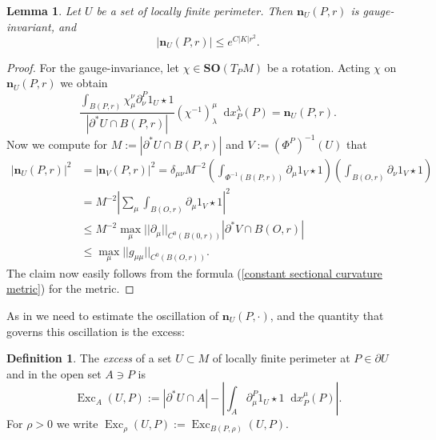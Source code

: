 \documentclass[reqno,10pt]{amsart}
\newcommand{\SpOrth}{\mathbf{SO}}
\DeclareMathOperator{\Exc}{Exc}
\newcommand*\dif{\mathop{}\!\mathrm{d}}
\newcommand{\normal}{\mathbf n}
\newcommand{\dfn}[1]{\emph{#1}\index{#1}}
\newtheorem{lemma}[theorem]{Lemma}
\theoremstyle{definition}
\newtheorem{definition}[theorem]{Definition}
\numberwithin{equation}{section}
\begin{document}
\begin{lemma}\label{gauge invariance of the normal}
Let $U$ be a set of locally finite perimeter. Then $\normal_U(P, r)$ is gauge-invariant, and
$$|\normal_U(P, r)| \leq e^{C|K|r^2}.$$
\end{lemma}
\begin{proof}
For the gauge-invariance, let $\chi \in \SpOrth(T_PM)$ be a rotation.
Acting $\chi$ on $\normal_U(P, r)$ we obtain
$$\frac{\int_{B(P, r)} \chi^\nu_\mu \partial^P_\nu 1_U \star 1}{|\partial^* U \cap B(P, r)|} (\chi^{-1})_\lambda^\mu \dif x^\lambda_P(P) = \normal_U(P, r).$$ 
Now we compute for $M := |\partial^* U \cap B(P, r)|$ and $V := (\Phi^P)^{-1}(U)$ that 
\begin{align*}
|\normal_U(P, r)|^2 &= |\normal_V(P, r)|^2 = \delta_{\mu\nu} M^{-2} \left(\int_{\Phi^{-1}(B(P, r))} \partial_\mu 1_V \star 1\right) \left(\int_{B(O, r)} \partial_\nu 1_V \star 1\right) \\
&= M^{-2} \left|\sum_\mu \int_{B(O, r)} \partial_\mu 1_V \star 1\right|^2 \\
&\leq M^{-2} \max_\mu ||\partial_\mu||_{C^0(B(0, r))} |\partial^* V \cap B(O, r)| \\
&\leq \max_\mu ||g_{\mu\mu}||_{C^0(B(O, r))}.
\end{align*}
The claim now easily follows from the formula (\ref{constant sectional curvature metric}) for the metric.
\end{proof}

As in \cite[Chapters 8-9]{Giusti77} we need to estimate the oscillation of $\normal_U(P, \cdot)$, and the quantity that governs this oscillation is the excess:

\begin{definition}
The \dfn{excess} of a set $U \subset M$ of locally finite perimeter at $P \in \partial U$ and in the open set $A \ni P$ is 
$$\Exc_A(U, P) := |\partial^* U \cap A| - \left|\int_A \partial^P_\mu 1_U \star 1 \dif x_P^\mu(P)\right|.$$
For $\rho > 0$ we write $\Exc_\rho(U, P) := \Exc_{B(P, \rho)}(U, P)$.
\end{definition}
\end{document}
